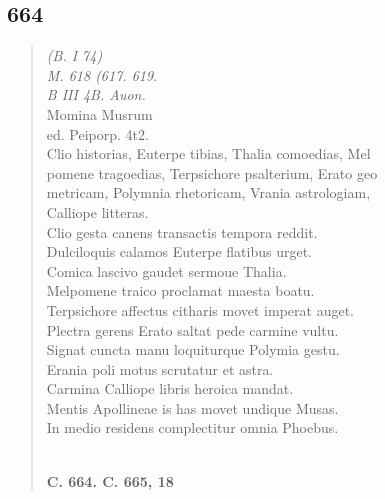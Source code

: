 \documentclass[11pt, a4paper]{report}
\begin{document}
            \subsection*{664}
      \begin{verse}
      \textit{(B. I 74)} \\ \textit{M. 618 (617. 619.} \\ \textit{B III 4B. Auon.} \\ Momina Musrum \\ ed. Peiporp. 4t2. \\  \lbrack Clio historias, Euterpe tibias, Thalia comoedias, Mel \\ pomene tragoedias, Terpsichore psalterium, Erato geo \\ metricam, Polymnia rhetoricam, Vrania astrologiam, \\ Calliope litteras. \rbrack  \\ Clio gesta canens transactis tempora reddit. \\ Dulciloquis calamos Euterpe flatibus urget. \\ Comica lascivo gaudet sermoue Thalia. \\ Melpomene traico proclamat maesta boatu. \\ Terpsichore affectus citharis movet imperat auget. \\ Plectra gerens Erato saltat pede carmine vultu. \\ Signat cuncta manu loquiturque Polymia gestu. \\ Erania poli motus scrutatur et astra. \\ Carmina Calliope libris heroica mandat. \\ Mentis Apollineae is has movet undique Musas. \\ In medio residens complectitur omnia Phoebus. \\ 
        ﻿\pagebreak 
    \begin{center} \textbf{C. 664. C. 665, 18} \end{center} \marginpar{[135]} 
      \end{verse}
  
\end{document}
